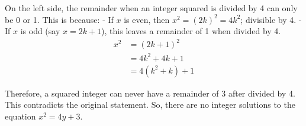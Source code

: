 \documentclass{article}
\begin{document}
On the left side, the remainder when an integer squared is divided by 4 can only be 0 or 1. This is because:
- If $x$ is even, then $x^2 = (2k)^2 = 4k^2$; divisible by 4.
- If $x$ is odd (say $x = 2k + 1$), this leaves a remainder of 1 when divided by 4.
\begin{align*}
    x^2 &= (2k + 1)^2 \\
    &= 4k^2 + 4k + 1 \\
    &= 4(k^2 + k) + 1
    \end{align*}


Therefore, a squared integer can never have a remainder of 3 after divided by 4. This contradicts the original statement. So, there are no integer solutions to the equation $x^2 = 4y + 3$.

\end{document}
